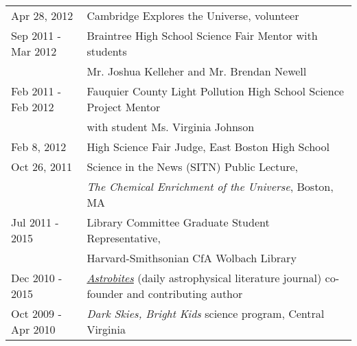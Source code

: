 \begin{tabular*}{\textwidth}{@{\hspace{10pt}}p{1.4in}l}
Apr 28, 2012 & Cambridge Explores the Universe, volunteer\\
Sep 2011 - Mar 2012 & Braintree High School Science Fair Mentor with students\\
& Mr. Joshua Kelleher and Mr. Brendan Newell\\
Feb 2011 - Feb 2012 & Fauquier County Light Pollution High School Science Project Mentor\\
& with student Ms. Virginia Johnson\\
Feb 8, 2012 & High Science Fair Judge, East Boston High School\\
Oct 26, 2011 & Science in the News (SITN) Public Lecture,\\
& \emph{The Chemical Enrichment of the Universe}, Boston, MA\\
Jul 2011 - 2015 & Library Committee Graduate Student Representative,\\
& Harvard-Smithsonian CfA Wolbach Library\\
Dec 2010 - 2015 & \href{http://astrobites.com/}{\emph{Astrobites}} (daily astrophysical literature journal) co-founder and contributing author\\
Oct 2009 - Apr 2010 & \emph{Dark Skies, Bright Kids} science program, Central Virginia\\
\end{tabular*}
